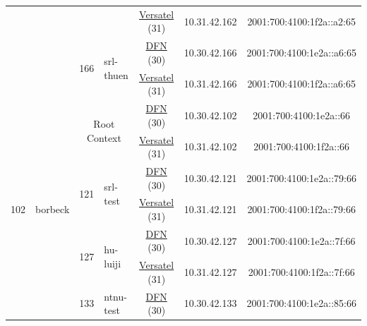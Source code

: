 \begin{small}
\begin{center}
\begin{longtable}{|c|c|c|c|c|c|c|c|}
  &  &  &  & \multicolumn{2}{|c|}{\tiny{\href{http://www.versatel.de}{Versatel} (31)}} & \tiny{10.31.42.162} & \tiny{2001:700:4100:1f2a::a2:65} \\* \cline{3-3}\cline{4-4}\cline{5-5}\cline{6-6}\cline{7-7}\cline{8-8}
  &  & \multirow{2}{*}{\tiny{166}} & \multicolumn{1}{|l|}{\multirow{2}{*}{\tiny{srl-thuen}}} & \multicolumn{2}{|c|}{\tiny{\href{https://www.dfn.de}{DFN} (30)}} & \tiny{10.30.42.166} & \tiny{2001:700:4100:1e2a::a6:65} \\* \cline{5-5}\cline{6-6}\cline{7-7}\cline{8-8}
  &  &  &  & \multicolumn{2}{|c|}{\tiny{\href{http://www.versatel.de}{Versatel} (31)}} & \tiny{10.31.42.166} & \tiny{2001:700:4100:1f2a::a6:65} \\ \hline
 \multirow{24}{*}{\tiny{102}} & \multicolumn{1}{|l|}{\multirow{24}{*}{\tiny{borbeck}}} & \multicolumn{2}{|c|}{\multirow{2}{*}{\tiny{Root Context}}} & \multicolumn{2}{|c|}{\tiny{\href{https://www.dfn.de}{DFN} (30)}} & \tiny{10.30.42.102} & \tiny{2001:700:4100:1e2a::66} \\* \cline{5-5}\cline{6-6}\cline{7-7}\cline{8-8}
  &  & \multicolumn{2}{|c|}{} & \multicolumn{2}{|c|}{\tiny{\href{http://www.versatel.de}{Versatel} (31)}} & \tiny{10.31.42.102} & \tiny{2001:700:4100:1f2a::66} \\* \cline{3-3}\cline{4-4}\cline{5-5}\cline{6-6}\cline{7-7}\cline{8-8}
  &  & \multirow{2}{*}{\tiny{121}} & \multicolumn{1}{|l|}{\multirow{2}{*}{\tiny{srl-test}}} & \multicolumn{2}{|c|}{\tiny{\href{https://www.dfn.de}{DFN} (30)}} & \tiny{10.30.42.121} & \tiny{2001:700:4100:1e2a::79:66} \\* \cline{5-5}\cline{6-6}\cline{7-7}\cline{8-8}
  &  &  &  & \multicolumn{2}{|c|}{\tiny{\href{http://www.versatel.de}{Versatel} (31)}} & \tiny{10.31.42.121} & \tiny{2001:700:4100:1f2a::79:66} \\* \cline{3-3}\cline{4-4}\cline{5-5}\cline{6-6}\cline{7-7}\cline{8-8}
  &  & \multirow{2}{*}{\tiny{127}} & \multicolumn{1}{|l|}{\multirow{2}{*}{\tiny{hu-luiji}}} & \multicolumn{2}{|c|}{\tiny{\href{https://www.dfn.de}{DFN} (30)}} & \tiny{10.30.42.127} & \tiny{2001:700:4100:1e2a::7f:66} \\* \cline{5-5}\cline{6-6}\cline{7-7}\cline{8-8}
  &  &  &  & \multicolumn{2}{|c|}{\tiny{\href{http://www.versatel.de}{Versatel} (31)}} & \tiny{10.31.42.127} & \tiny{2001:700:4100:1f2a::7f:66} \\* \cline{3-3}\cline{4-4}\cline{5-5}\cline{6-6}\cline{7-7}\cline{8-8}
  &  & \multirow{2}{*}{\tiny{133}} & \multicolumn{1}{|l|}{\multirow{2}{*}{\tiny{ntnu-test}}} & \multicolumn{2}{|c|}{\tiny{\href{https://www.dfn.de}{DFN} (30)}} & \tiny{10.30.42.133} & \tiny{2001:700:4100:1e2a::85:66} \\* \cline{5-5}\cline{6-6}\cline{7-7}\cline{8-8}

\end{longtable}
\end{center}
\end{small}
